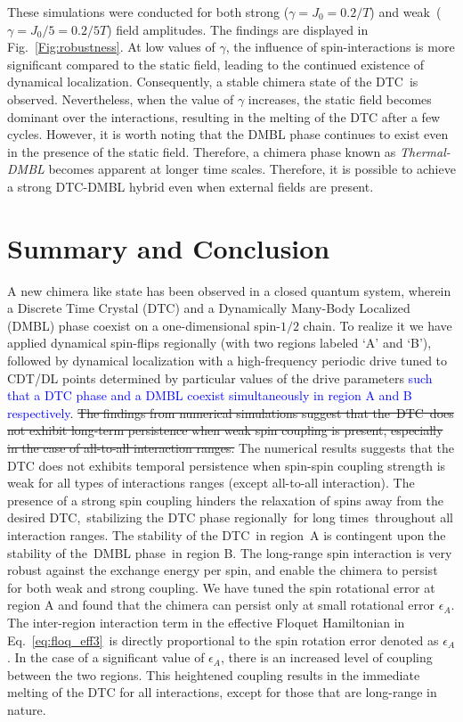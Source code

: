\documentclass[
nofootinbib,
reprint,
superscriptaddress,
amsmath,amssymb,showkeys,
aps,
prb,
]{revtex4-2}
\newcommand{\blue}[1]{\textcolor{blue}{#1}}
\begin{document}
	These simulations were conducted for both strong ($\gamma= J_0=0.2/T$) and weak ($ \gamma=J_0/5 = 0.2/5T$) field amplitudes. The findings are displayed in Fig.~\ref{Fig:robustness}. At low values of $\gamma$, the influence of spin-interactions is more significant compared to the static field, leading to the continued existence of dynamical localization. Consequently, a stable chimera state of the DTC is observed. Nevertheless, when the value of $\gamma$ increases, the static field becomes dominant over the interactions, resulting in the melting of the DTC after a few cycles. However, it is worth noting that the DMBL phase continues to exist even in the presence of the static field. Therefore, a chimera phase known as \textit{Thermal-DMBL} becomes apparent at longer time scales. Therefore, it is possible to achieve a strong DTC-DMBL hybrid even when external fields are present.
	
	\section{\label{sec:level7} Summary and Conclusion}
	A new chimera like state has been observed in a closed quantum system, wherein a Discrete Time Crystal (DTC) and a Dynamically Many-Body Localized (DMBL) phase coexist on a one-dimensional spin-$1/2$ chain. To realize it we have applied dynamical spin-flips regionally (with two regions labeled `A' and `B'), followed by dynamical localization with a high-frequency periodic drive tuned to CDT/DL points determined by particular values of the drive parameters \blue{such that a DTC phase and a DMBL coexist simultaneously in region A and B respectively}. \sout{The findings from numerical simulations suggest that the DTC does not exhibit long-term persistence when weak spin coupling is present, especially in the case of all-to-all interaction ranges.} The numerical results suggests that the DTC does not exhibits temporal persistence when spin-spin coupling strength is weak for all types of interactions ranges (except all-to-all interaction). The presence of a strong spin coupling hinders the relaxation of spins away from the desired DTC, stabilizing the DTC phase regionally for long times throughout all interaction ranges. The stability of the DTC in region A is contingent upon the stability of the DMBL phase in region B. The long-range spin interaction is very robust against the exchange energy per spin, and enable the chimera to persist for both weak and strong coupling. We have tuned the spin rotational error at region A and found that the chimera can persist only at small rotational error $\epsilon_A$. The inter-region interaction term in the effective Floquet Hamiltonian in Eq.~\ref{eq:floq_eff3} is directly proportional to the spin rotation error denoted as $\epsilon_A$. In the case of a significant value of $\epsilon_A$, there is an increased level of coupling between the two regions. This heightened coupling results in the immediate melting of the DTC for all interactions, except for those that are long-range in nature.
	
\end{document}
